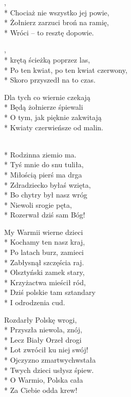 \begin{lyrics}[longestline={Po ten kwiat, po ten kwiat czerwony,}]

,\\*
Chociaż nie wszystko jej powie,\\*
Żołnierz zarzuci broń na ramię,\\*
Wróci -- to resztę dopowie.

\begin{chorus}
,\\*
krętą ścieżką poprzez las,\\*
Po ten kwiat, po ten kwiat czerwony,\\*
Skoro przyszedł na to czas.
\end{chorus}

Dla tych co wiernie czekają\\*
Będą żołnierze śpiewali\\*
O tym, jak pięknie zakwitają\\*
Kwiaty czerwieńsze od malin.

\chorusref
\end{lyrics}


\begin{lyrics}[longestline={\vin Dziś polskie tam sztandary}]

\\*
Rodzinna ziemio ma.\\*
Tyś mnie do snu tuliła,\\*
Miłością pierś ma drga\\*
\smallskip
\vin Zdradziecko byłaś wzięta,\\*
\vin Bo chytry był nasz wróg\\*
\vin Niewoli srogie pęta,\\*
\vin Rozerwał dziś sam Bóg!

My Warmii wierne dzieci\\*
Kochamy ten nasz kraj,\\*
Po latach burz, zamieci\\*
Zabłysnął szczęścia raj.\\*
\smallskip
\vin Olsztyński zamek stary,\\*
\vin Krzyżactwa mieścił ród,\\*
\vin Dziś polskie tam sztandary\\*
\vin I odrodzenia cud.

Rozdarły Polskę wrogi,\\*
Przyszła niewola, znój,\\*
Lecz Biały Orzeł drogi\\*
Lot zwrócił ku niej swój!\\*
\smallskip
\vin Ojczyzno zmartwychwstała\\*
\vin Twych dzieci usłysz śpiew.\\*
\vin O Warmio, Polska cała\\*
\vin Za Ciebie odda krew!
\end{lyrics}



